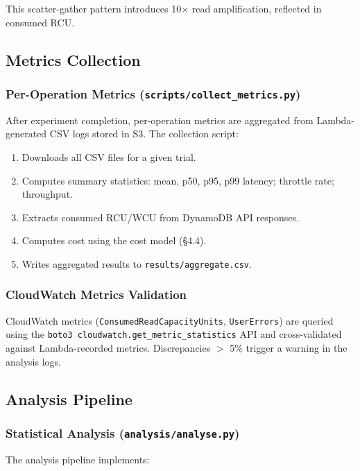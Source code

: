 This scatter-gather pattern introduces 10× read amplification, reflected in consumed RCU.

\subsection{Metrics Collection}

\subsubsection{Per-Operation Metrics (\texttt{scripts/collect\_metrics.py})}

After experiment completion, per-operation metrics are aggregated from Lambda-generated CSV logs stored in S3. The collection script:

\begin{enumerate}
    \item Downloads all CSV files for a given trial.
    \item Computes summary statistics: mean, p50, p95, p99 latency; throttle rate; throughput.
    \item Extracts consumed RCU/WCU from DynamoDB API responses.
    \item Computes cost using the cost model (§4.4).
    \item Writes aggregated results to \texttt{results/aggregate.csv}.
\end{enumerate}

\subsubsection{CloudWatch Metrics Validation}

CloudWatch metrics (\texttt{ConsumedReadCapacityUnits}, \texttt{UserErrors}) are queried using the \texttt{boto3 cloudwatch.get\_metric\_statistics} API and cross-validated against Lambda-recorded metrics. Discrepancies $>$ 5\% trigger a warning in the analysis logs.

\subsection{Analysis Pipeline}

\subsubsection{Statistical Analysis (\texttt{analysis/analyse.py})}

The analysis pipeline implements:

